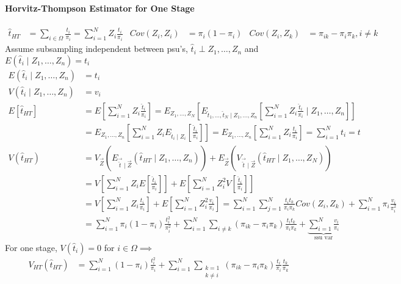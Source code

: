 \documentclass[landscape]{article}
\begin{document}
\begin{multicols*}{3}
\paragraph{Horvitz-Thompson Estimator for One Stage}
\begin{align*}
  \hat{t}_{HT} & = \sum_{i \in \Omega} \frac{{t}_i}{\pi_i} = \sum_{i=1}^N Z_i \frac{t_i}{\pi_i}
  & Cov(Z_i,Z_i) & = \pi_i (1- \pi_i) & Cov(Z_i, Z_k) & = \pi_{ik} - \pi_i \pi_k, i \neq k
\end{align*}
Assume subsampling independent between psu's, $\hat{t}_i \perp Z_1,
\ldots, Z_n$ and $E(\hat{t}_i \mid Z_1, \ldots, Z_n) = t_i$
\begin{align*}
  E(\hat{t}_i \mid Z_1, \ldots, Z_n) & = t_i
  \\ V(\hat{t}_i \mid Z_1, \dots, Z_n) & = v_i
  \\  E[\hat{t}_{HT}] & = E \left[\sum_{i=1}^N Z_i \frac{\hat{t}_{i}}{\pi_i}\right] = E_{Z_1, \ldots, Z_N} \left[E_{\hat{t}_1, \ldots, \hat{t}_N \mid Z_1, \ldots, Z_n} \left[\sum_{i=1}^N Z_i \frac{\hat{t}_i}{\pi_i}\mid Z_1, \ldots, Z_n\right]\right]
  \\ & = E_{Z_1, \ldots, Z_n} \left[\sum_{i=1}^N Z_i E_{\hat{t}_i \mid Z_i} \left[\frac{\hat{t}_i}{\pi_i}\right]\right] = E_{Z_1, \ldots, Z_n} \left[\sum_{i=1}^N Z_i \frac{t_i}{\pi_i}\right] = \sum_{i=1}^N t_i = t
  \\ V(\hat{t}_{HT}) & = V_{\vec{Z}} (E_{\vec{\hat{t}} \mid \vec{Z}} (\hat{t}_{HT} \mid Z_1, \ldots, Z_n)) + E_{\vec{Z}} (V_{\vec{\hat{t}}\mid \vec{Z}}(\hat{t}_{HT} \mid Z_1, \ldots, Z_N))
  \\ &                       = V \left[\sum_{i=1}^N Z_i E \left[\frac{\hat{t}_i}{\pi_i}\right]\right] + E \left[\sum_{i=1}^N Z_i^2 V \left[\frac{\hat{t}_i}{\pi_i}\right]\right]
  \\ & = V \left[\sum_{i=1}^N Z_i \frac{t_i}{\pi_i}\right] + E \left[\sum_{i=1}^N Z_i^2 \frac{v_i}{\pi_i}\right]
       = \sum_{i=1}^N \sum_{j=1}^{N} \frac{t_it_k}{\pi_i\pi_k} Cov(Z_i, Z_k) + \sum_{i=1}^N \pi_i\frac{v_i}{\pi_i^2}
  \\ & = \sum_{i=1}^N \pi_i (1- \pi_i) \frac{t_i^2}{\pi_i^2} +
       \sum_{i=1}^N \sum_{i \neq k} (\pi_{ik} - \pi_i \pi_k)
       \frac{t_it_k}{\pi_i\pi_k} + \underbrace{\sum_{i=1}^N
       \frac{v_i}{\pi_i}}_{\text{ssu var}}
\end{align*}
For one stage, $V(\hat{t}_i) = 0$ for $i \in \Omega \implies$
\begin{align*}
  V_{HT}(\hat{t}_{HT}) & = \sum_{i=1}^N (1-\pi_i) \frac{t_i^2}{\pi_i} + \sum_{i=1}^N \sum_{\substack{k = 1\\k \neq i}} (\pi_{ik} - \pi_i \pi_k) \frac{t_i}{\pi_i} \frac{t_k}{\pi_k}

\end{align*}
\end{multicols*}
\end{document}

